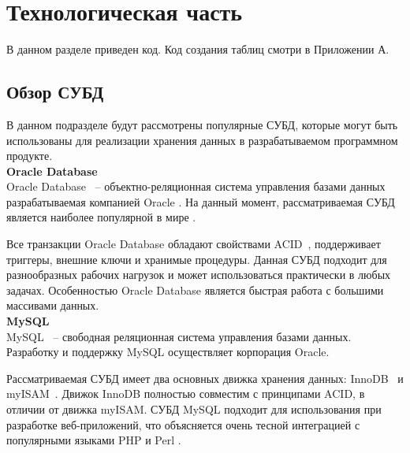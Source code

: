 \chapter{Технологическая часть}
\label{cha:impl}

В данном разделе приведен код. Код создания таблиц смотри в Приложении А.

\section{Обзор СУБД}

В данном подразделе будут рассмотрены популярные СУБД, которые могут быть использованы для реализации хранения данных в разрабатываемом программном продукте.\\

\noindent\textbf{Oracle Database}\\

Oracle Database~\cite{oracle} -- объектно-реляционная система управления базами данных разрабатываемая компанией Oracle \cite{oracle-company}. На данный момент, рассматриваемая СУБД является наиболее популярной в мире \cite{oracle-popular}. 

Все транзакции Oracle Database обладают свойствами ACID~\cite{acid}, поддерживает триггеры, внешние ключи и хранимые процедуры. Данная СУБД подходит для разнообразных рабочих нагрузок и может использоваться практически в любых задачах. Особенностью Oracle Database является быстрая работа с большими массивами данных.\\

\noindent\textbf{MySQL}\\

MySQL~\cite{mysql} -- свободная реляционная система управления базами данных. Разработку и поддержку MySQL осуществляет корпорация Oracle.

Рассматриваемая СУБД имеет два основных движка хранения данных: InnoDB~\cite{innodb} и myISAM~\cite{myisam}. Движок InnoDB полностью совместим с принципами ACID, в отличии от движка myISAM. СУБД MySQL подходит для использования при разработке веб-приложений, что объясняется очень тесной интеграцией с популярными языками PHP \cite{php} и Perl \cite{perl}.

